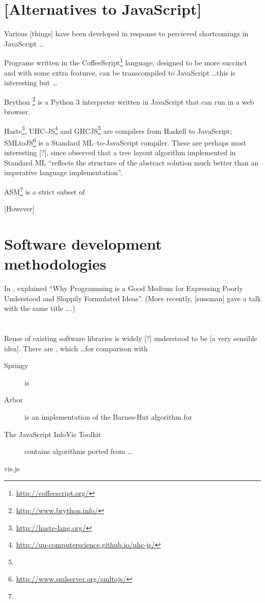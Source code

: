 \documentclass[authoryearcitations]{UoYCSproject}
\begin{document}
\begin{itemize*}
\section{[Alternatives to JavaScript]}

Various [things] have been developed in response to percieved shortcomings in JavaScript \ldots

Programs written in the CoffeeScript\footnote{\url{http://coffeescript.org/}} language, designed to be more succinct and with some extra features, can be transcompiled to JavaScript \ldots this is interesting but \ldots

Brython \footnote{\url{http://www.brython.info/}} is a Python 3 interpreter written in JavaScript that can run in a web browser. 

Haste\footnote{\url{http://haste-lang.org/}}, UHC-JS\footnote{\url{http://uu-computerscience.github.io/uhc-js/}} and GHCJS\footnote{} are compilers from Haskell to JavaScript; SMLtoJS\footnote{\url{http://www.smlserver.org/smltojs/}} is a Standard ML--to-JavaScript compiler. These are perhaps most interesting [?], since \citet{kennedyfuntrees} observed that a tree layout algorithm implemented in Standard ML ``reflects the structure of the abstract solution much better than an imperative language implementation''.



ASM\footnote{} is a strict subset of 

[However]


\section{Software development methodologies}

In \citeyear{67poorslop}, \citet*{67poorslop} explained ``Why Programming is a Good Medium for Expressing Poorly Understood and Sloppily Formulated Ideas''.
(More recently, [sussman] gave a talk with the same title \ldots {}.)


\section{}

Reuse of existing software libraries is widely [?] understood to be [a very sensible idea]. There are , which \ldots for comparison with 

\begin{description}
  \item[Springy] is
  \item[Arbor] is an implementation of the Barnes-Hut algorithm for 
  \item[The JavaScript InfoVis Toolkit] contains algorithms ported from \ldots
  \item[vis.js]
\end{description}


\end{itemize*}
\end{document}
